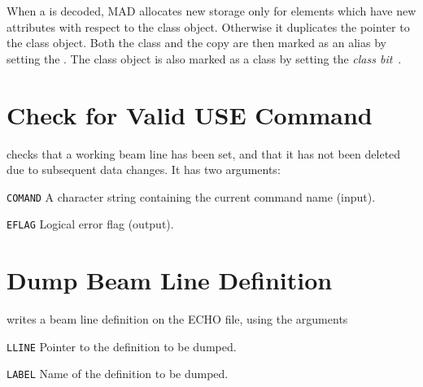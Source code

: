 \label{clsmark}
When a  is decoded, MAD allocates new storage only
for elements which have new attributes with respect to the class
object.
Otherwise it duplicates the pointer to the class object.
Both the class and the copy are then marked as an alias by setting the
 .
The class object is also marked as a class by setting the
{\em class bit}~.

\section{Check for Valid USE Command}
\label{LNCHCK}
checks that a working beam line has been set,
and that it has not been deleted due to subsequent data changes.
It has two arguments:
\begin{mylist}
\item[\tt COMAND]
A character string containing the current command name (input).
\item[\tt EFLAG]
Logical error flag (output).
\end{mylist}

\section{Dump Beam Line Definition}
\label{LNDUMP}
writes a beam line definition on the ECHO file,
using the arguments
\begin{mylist}
\item[\tt LLINE]
Pointer to the definition to be dumped.
\item[\tt LABEL]
Name of the definition to be dumped.
\end{mylist}

